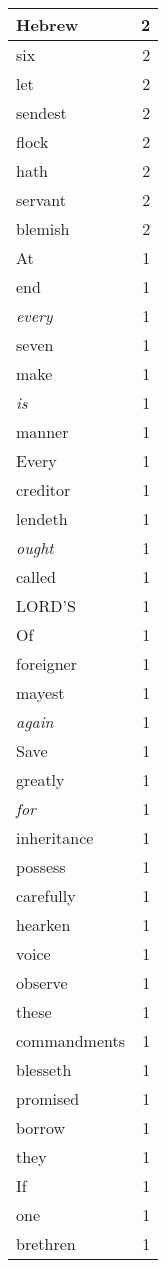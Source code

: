 \begin{center}
\begin{longtable}{l|r}
Hebrew & 2 \\ \hline
six & 2 \\ \hline
let & 2 \\ \hline
sendest & 2 \\ \hline
flock & 2 \\ \hline
hath & 2 \\ \hline
servant & 2 \\ \hline
blemish & 2 \\ \hline
At & 1 \\ \hline
end & 1 \\ \hline
\emph{every} & 1 \\ \hline
seven & 1 \\ \hline
make & 1 \\ \hline
\emph{is} & 1 \\ \hline
manner & 1 \\ \hline
Every & 1 \\ \hline
creditor & 1 \\ \hline
lendeth & 1 \\ \hline
\emph{ought} & 1 \\ \hline
called & 1 \\ \hline
LORD'S & 1 \\ \hline
Of & 1 \\ \hline
foreigner & 1 \\ \hline
mayest & 1 \\ \hline
\emph{again} & 1 \\ \hline
Save & 1 \\ \hline
greatly & 1 \\ \hline
\emph{for} & 1 \\ \hline
inheritance & 1 \\ \hline
possess & 1 \\ \hline
carefully & 1 \\ \hline
hearken & 1 \\ \hline
voice & 1 \\ \hline
observe & 1 \\ \hline
these & 1 \\ \hline
commandments & 1 \\ \hline
blesseth & 1 \\ \hline
promised & 1 \\ \hline
borrow & 1 \\ \hline
they & 1 \\ \hline
If & 1 \\ \hline
one & 1 \\ \hline
brethren & 1 \\ \hline

\end{longtable}
\end{center}
